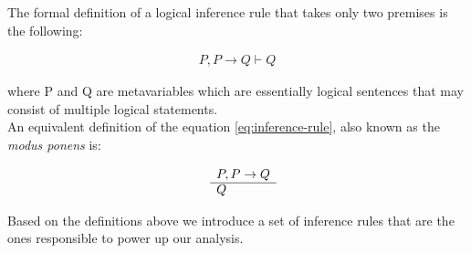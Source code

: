 The formal definition of a logical inference rule that takes only two premises is the following:

\begin{equation}
  \label{eq:inference-rule}
  \begin{aligned}
    P, P \rightarrow Q \vdash Q
  \end{aligned}
\end{equation}

where P and Q are metavariables which are essentially logical sentences that may consist
of multiple logical statements.\\

An equivalent definition of the equation \ref{eq:inference-rule}, also known as the
\emph{modus ponens} is:

\begin{equation}
  \label{eq:modus-ponens}
  \begin{aligned}
  \begin{array}{rl}
    & P,  P \to Q \\
    \cline{2-2}
    & Q
  \end{array}
  \end{aligned}
\end{equation}

Based on the definitions above we introduce a set of inference rules that are the ones
responsible to power up our analysis.

